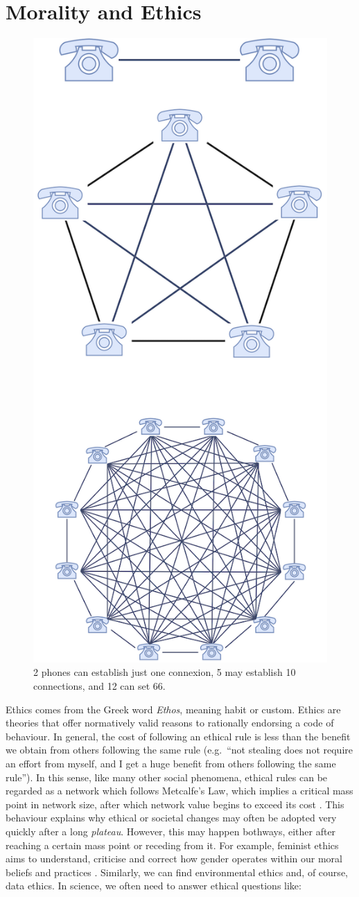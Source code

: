 \documentclass[
]{book}
\begin{document}
\hypertarget{morality-and-ethics}{%
\section{Morality and Ethics}\label{morality-and-ethics}}

\begin{figure}  
 \begin{center}
    \includegraphics[width=.22\textwidth]{Figures/metcalfe.png}  
  \captionsetup{labelformat=empty}
  \caption{2 phones can establish just one connexion, 5 may establish 10 connections, and 12 can set 66.} 
\end{center}
\end{figure}
\addtocounter{figure}{-1}

Ethics comes from the Greek word \emph{Ethos}, meaning habit or custom. Ethics are theories that offer normatively valid reasons to rationally endorsing a code of behaviour. In general, the cost of following an ethical rule is less than the benefit we obtain from others following the same rule (e.g.~``not stealing does not require an effort from myself, and I get a huge benefit from others following the same rule''). In this sense, like many other social phenomena, ethical rules can be regarded as a network which follows Metcalfe's Law, which implies a critical mass point in network size, after which network value begins to exceed its cost \citep{metcalfe2013metcalfe}. This behaviour explains why ethical or societal changes may often be adopted very quickly after a long \emph{plateau}. However, this may happen bothways, either after reaching a certain mass point or receding from it. For example, feminist ethics aims to understand, criticise and correct how gender operates within our moral beliefs and practices \citep{sep-feminism-ethics}. Similarly, we can find environmental ethics and, of course, data ethics. In science, we often need to answer ethical questions like:
\end{document}

